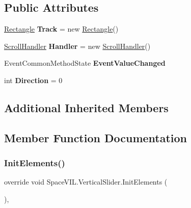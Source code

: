 \subsection*{Public Attributes}
\begin{DoxyCompactItemize}
\item 
\mbox{\label{class_space_v_i_l_1_1_vertical_slider_a8b25ba3af337ee1800723ac28013497d}} 
\mbox{\hyperlink{class_space_v_i_l_1_1_rectangle}{Rectangle}} {\bfseries Track} = new \mbox{\hyperlink{class_space_v_i_l_1_1_rectangle}{Rectangle}}()
\item 
\mbox{\label{class_space_v_i_l_1_1_vertical_slider_ab383c5777fc2a267b855dc1a05dce681}} 
\mbox{\hyperlink{class_space_v_i_l_1_1_scroll_handler}{Scroll\+Handler}} {\bfseries Handler} = new \mbox{\hyperlink{class_space_v_i_l_1_1_scroll_handler}{Scroll\+Handler}}()
\item 
\mbox{\label{class_space_v_i_l_1_1_vertical_slider_a817704bf35e4d9c6c0efb39cb25b10f6}} 
Event\+Common\+Method\+State {\bfseries Event\+Value\+Changed}
\item 
\mbox{\label{class_space_v_i_l_1_1_vertical_slider_a3f132d2a9edac29a1de9a6561c014d0d}} 
int {\bfseries Direction} = 0
\end{DoxyCompactItemize}
\subsection*{Additional Inherited Members}


\subsection{Member Function Documentation}
\mbox{\label{class_space_v_i_l_1_1_vertical_slider_a22ab138c5fbb0bdc8c56f7673998dfcb}} 
\subsubsection{\texorpdfstring{Init\+Elements()}{InitElements()}}
{\footnotesize\ttfamily override void Space\+V\+I\+L.\+Vertical\+Slider.\+Init\+Elements (\begin{DoxyParamCaption}{ }\end{DoxyParamCaption})\hspace{0.3cm}{\ttfamily [inline]}, {\ttfamily [virtual]}}



